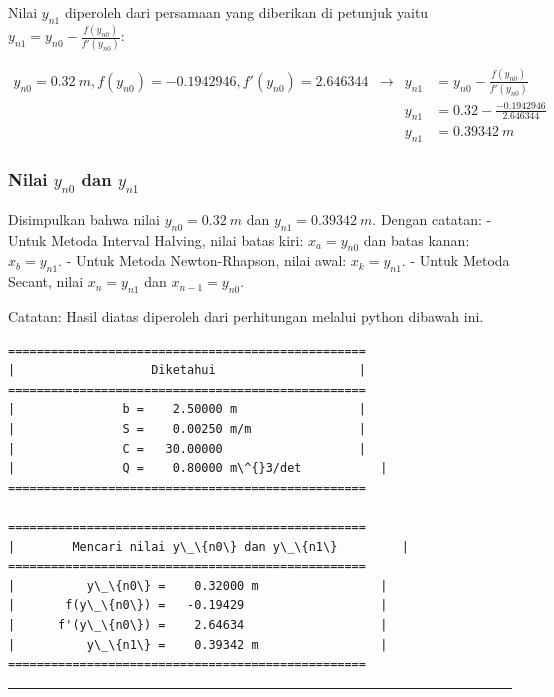 \documentclass[10pt, a4paper]{article}
\begin{document}
Nilai \(y_{n1}\) diperoleh dari persamaan yang diberikan di petunjuk
yaitu \(y_{n1} = y_{n0}-\frac{f(y_{n0})}{f'(y_{n0})}\):

\[\begin{aligned} y_{n0} = 0.32\ m, f(y_{n0}) = -0.1942946, f'(y_{n0}) = 2.646344 &\rightarrow& y_{n1} &= y_{n0}-\frac{f(y_{n0})}{f'(y_{n0})} \\
&& y_{n1} &= 0.32 - \frac{-0.1942946}{2.646344} \\
&& y_{n1} &= 0.39342\ m
\end{aligned}\]

\subsubsection{\texorpdfstring{Nilai \(y_{n0}\) dan
\(y_{n1}\)}{Nilai y\_\{n0\} dan y\_\{n1\}}}\label{nilai-y_n0-dan-y_n1}

Disimpulkan bahwa nilai \(y_{n0} = 0.32\ m\) dan
\(y_{n1} = 0.39342\ m\). Dengan catatan: - Untuk Metoda Interval
Halving, nilai batas kiri: \(x_a = y_{n0}\) dan batas kanan:
\(x_b = y_{n1}\). - Untuk Metoda Newton-Rhapson, nilai awal:
\(x_k = y_{n1}\). - Untuk Metoda Secant, nilai \(x_n = y_{n1}\) dan
\(x_{n-1} = y_{n0}\).

Catatan: Hasil diatas diperoleh dari perhitungan melalui python dibawah
ini.

    \begin{Verbatim}[commandchars=\\\{\}]
==================================================
|                   Diketahui                    |
==================================================
|               b =    2.50000 m                 |
|               S =    0.00250 m/m               |
|               C =   30.00000                   |
|               Q =    0.80000 m\^{}3/det           |
==================================================

==================================================
|        Mencari nilai y\_\{n0\} dan y\_\{n1\}         |
==================================================
|          y\_\{n0\} =    0.32000 m                 |
|       f(y\_\{n0\}) =   -0.19429                   |
|      f'(y\_\{n0\}) =    2.64634                   |
|          y\_\{n1\} =    0.39342 m                 |
==================================================

    \end{Verbatim}

    \begin{center}\rule{0.5\linewidth}{\linethickness}\end{center}
\end{document}
